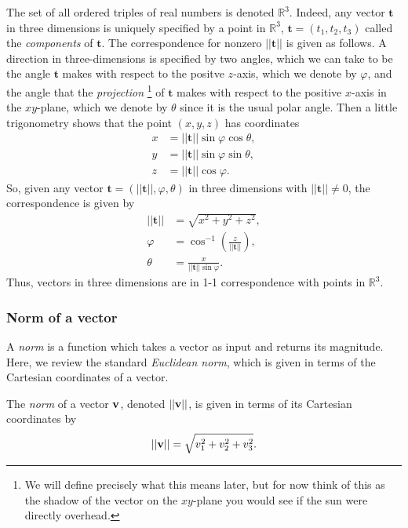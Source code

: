 \documentclass[12pt,letterpaper,reqno]{article}
\numberwithin{equation}{section}
\newcommand{\ti}[1]{\textit{#1}}
\begin{document}
The set of all ordered triples of real numbers is denoted $\mathbb{R}^3$.  Indeed, any vector $\mathbf{t}$ in three dimensions is uniquely specified by a point in $\mathbb{R}^3$, $\mathbf{t}=(t_1,t_2,t_3)$ called the \emph{components} of $\mathbf{t}$. The correspondence for nonzero $||\mathbf{t}||$ is given as follows. A direction in three-dimensions is specified by two angles, which we can take to be the angle $\mathbf{t}$ makes with respect to the positve $z$-axis, which we denote by $\varphi$, and the angle that the \emph{projection} \footnote{We will define precisely what this means later, but for now think of this as the shadow of the vector on the $xy$-plane you would see if the sun were directly overhead.} of $\mathbf{t}$ makes with respect to the positive $x$-axis in the $xy$-plane, which we denote by $\theta$ since it is the usual polar angle. Then a little trigonometry shows that the point $(x,y,z)$ has coordinates
\begin{align*}
	x &=||\mathbf{t}||\sin \varphi \cos \theta, \\
	y &=||\mathbf{t}||\sin \varphi \sin\theta, \\
	z &=||\mathbf{t}||\cos \varphi.
\end{align*}
So, given any vector $\mathbf{t}=(||\mathbf{t}||,\varphi,\theta)$ in three dimensions with $||\mathbf{t}||\neq 0$, the correspondence is given by
\begin{align*}
	||\mathbf{t}||&=\sqrt{x^2+y^2+z^2}, \\
	\varphi &= \cos^{-1}\left(\frac{z}{||\mathbf{t}||}\right), \\
	\theta &=\frac{x}{||\mathbf{t}||\sin \varphi}.
\end{align*}
Thus, vectors in three dimensions are in 1-1 correspondence with points in $\mathbb{R}^3$.



\subsubsection{Norm of a vector}
A \ti{norm} is a function which takes a vector as input and returns its magnitude. Here, we review the standard \ti{Euclidean norm}, which is given in terms of the Cartesian coordinates of a vector. 
\begin{defn}\label{def:length_of_a_vector}
	The \ti{norm} of a vector ${\bf v}$, denoted $||{\bf v}||$, is given in terms of its Cartesian coordinates by
	\begin{align*}
		||{\bf v}||=\sqrt{v_1^2+v_2^2+v_3^2}.
	\end{align*}
\end{defn}
\end{document}
